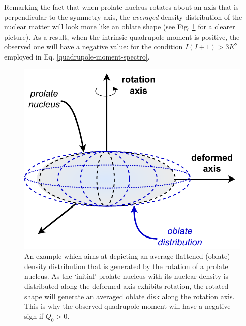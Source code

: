 Remarking the fact that when prolate nucleus rotates about an axis that is perpendicular to the symmetry axis, the \emph{averaged} density distribution of the nuclear matter will look more like an oblate shape (see Fig. \ref{fig-averaged-prolate-density} for a clearer picture). As a result, when the intrinsic quadrupole moment is positive, the observed one will have a negative value: for the condition $I(I+1)>3K^2$ employed in Eq. \ref{quadrupole-moment-spectro}.
\begin{figure}
    \centering
    \includegraphics[scale=0.65]{Chapters/Figures/averaged_nuclearMatter_prolate.pdf}
    \caption{An example which aims at depicting an average flattened (oblate) density distribution that is generated by the rotation of a prolate nucleus. As the `initial' prolate nucleus with its nuclear density is distributed along the deformed axis exhibits rotation, the rotated shape will generate an averaged oblate disk along the rotation axis. This is why the observed quadrupole moment will have a negative sign if $Q_0>0$.}
    \label{fig-averaged-prolate-density}
\end{figure}

